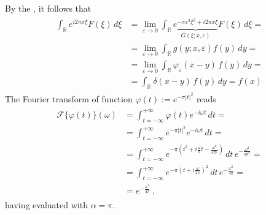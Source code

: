 \documentclass[letterpaper,10pt,english]{jupyterBook}
\begin{document}
\sphinxAtStartPar
{} By the , it follows that
\begin{equation*}
\begin{split}\begin{aligned}
  \int_{\mathbb{R}} e^{i 2 \pi x \xi} F(\xi) \, d \xi
  & = \lim_{\varepsilon \rightarrow 0} \int_{\mathbb{R}} \underbrace{e^{-\pi \varepsilon^2 \xi^2 + i 2 \pi x \xi}}_{G(\xi;x,\varepsilon)} F(\xi) \, d \xi = \\
  & = \lim_{\varepsilon \rightarrow 0} \int_{\mathbb{R}} g(y;x,\varepsilon) f(y) \, dy = \\
  & = \lim_{\varepsilon \rightarrow 0} \int_{\mathbb{R}} \varphi_{\varepsilon}(x-y) \, f(y) \, dy = \\
  & = \int_{\mathbb{R}} \delta(x-y) \, f(y) \, dy = f(x)
\end{aligned}\end{split}
\end{equation*}
\sphinxAtStartPar
{} The Fourier transform of function \(\varphi(t):= e^{-\pi|t|^2}\) reads
\begin{equation*}
\begin{split}\begin{aligned}
\mathscr{F}\{ \varphi(t) \}(\omega) 
 & = \int_{t=-\infty}^{+\infty} \varphi(t) e^{-i \omega t} \, dt = \\ 
 & = \int_{t=-\infty}^{+\infty} e^{-\pi|t|^2} e^{-i \omega t} \, dt = \\
 & = \int_{t=-\infty}^{+\infty} e^{-\pi \left( t^2 + i \frac{\omega}{\pi} t - \frac{\omega^2}{4 \pi^2}  \right)} \, dt \, e^{- \frac{\omega^2}{4 \pi^2}} = \\
 & = \int_{t=-\infty}^{+\infty} e^{-\pi \left( t + i \frac{\omega}{2 \pi}  \right)^2} \, dt \, e^{- \frac{\omega^2}{4 \pi}} = \\
 & = e^{- \frac{\omega^2}{4 \pi}} \ ,
\end{aligned}\end{split}
\end{equation*}
\sphinxAtStartPar
having evaluated {\hyperref[\detokenize{ch/functional-analysis/dirac-delta:integral-e-x2}]{}} with \(\alpha = \pi\).  
\end{document}
